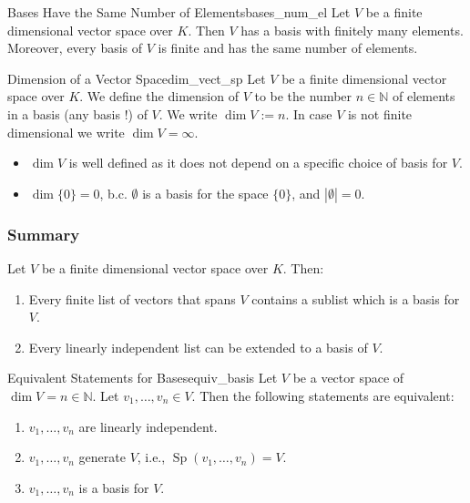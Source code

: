 \begin{theorem}{Bases Have the Same Number of Elements}{bases_num_el}
	Let $V$ be a finite dimensional vector space over $K$. Then $V$ has a basis with finitely many elements. Moreover, every basis of $V$ is finite and has the same number of elements.
\end{theorem}

\begin{definition}{Dimension of a Vector Space}{dim_vect_sp}
	Let $V$ be a finite dimensional vector space over $K$. We define the dimension of $V$ to be the number $n \in \mathbb{N}$ of elements in a basis (any basis !) of $V$. We write $\operatorname{dim}V := n$. In case $V$ is not finite dimensional we write $\operatorname{dim}V = \infty$.
\end{definition}

\begin{remark}
	\begin{itemize}
		\item[$\bullet$] $\operatorname{dim}V$ is well defined as it does not depend on a specific choice of basis for $V$.
		\item[$\bullet$] $\dim\{0\} = 0$, b.c. $\emptyset$ is a basis for the space $\{0\}$, and $|\emptyset| = 0$.
	\end{itemize}
\end{remark}

\subsubsection*{Summary}
Let $V$ be a finite dimensional vector space over $K$. Then:
\begin{enumerate}
	\item[(1)] Every finite list of vectors that spans $V$ contains a sublist which is a basis for $V$.
	\item[(2)] Every linearly independent list can be extended to a basis of $V$.
\end{enumerate}

\begin{theorem}{Equivalent Statements for Bases}{equiv_basis}
	Let $V$ be a vector space of $\dim V = n \in \mathbb{N}$. Let $v_1, \hdots , v_n \in V$. Then the following statements are equivalent:
	\begin{enumerate}
		\item[(1)] $v_1, \hdots , v_n$ are linearly independent.
		\item[(2)] $v_1, \hdots , v_n$ generate $V$, i.e., $\operatorname{Sp}(v_1, \hdots , v_n) = V$.
		\item[(3)] $v_1, \hdots , v_n$ is a basis for $V$.
	\end{enumerate}
\end{theorem}

